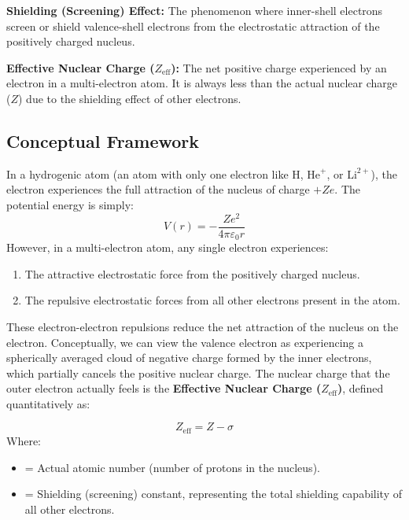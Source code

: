 \documentclass[12pt,a4paper]{article}
\begin{document}
\begin{tcolorbox}[defbox, title={Definitions: Shielding and Effective Nuclear Charge}]
  \textbf{Shielding (Screening) Effect:} The phenomenon where inner-shell electrons screen or shield valence-shell electrons from the electrostatic attraction of the positively charged nucleus.
  \par\vspace{4pt}
  \textbf{Effective Nuclear Charge ($Z_{\text{eff}}$):} The net positive charge experienced by an electron in a multi-electron atom. It is always less than the actual nuclear charge ($Z$) due to the shielding effect of other electrons.
\end{tcolorbox}

\subsection{Conceptual Framework}
In a hydrogenic atom (an atom with only one electron like $\text{H}$, $\text{He}^+$, or $\text{Li}^{2+}$), the electron experiences the full attraction of the nucleus of charge $+Ze$. The potential energy is simply:
\[ V(r) = -\frac{Ze^2}{4\pi\varepsilon_0 r} \]
However, in a multi-electron atom, any single electron experiences:
\begin{enumerate}
  \item The attractive electrostatic force from the positively charged nucleus.
  \item The repulsive electrostatic forces from all other electrons present in the atom.
\end{enumerate}

These electron-electron repulsions reduce the net attraction of the nucleus on the electron. Conceptually, we can view the valence electron as experiencing a spherically averaged cloud of negative charge formed by the inner electrons, which partially cancels the positive nuclear charge. The nuclear charge that the outer electron actually feels is the \textbf{Effective Nuclear Charge ($Z_{\text{eff}}$)}, defined quantitatively as:

\begin{tcolorbox}[formulabox, title={Effective Nuclear Charge Equation}]
  \[ Z_{\text{eff}} = Z - \sigma \]
  Where:
  \begin{itemize}[leftmargin=1.5cm, itemsep=1pt]
    \item[$Z$] = Actual atomic number (number of protons in the nucleus).
    \item[$\sigma$] = Shielding (screening) constant, representing the total shielding capability of all other electrons.
  \end{itemize}
\end{tcolorbox}
\end{document}
